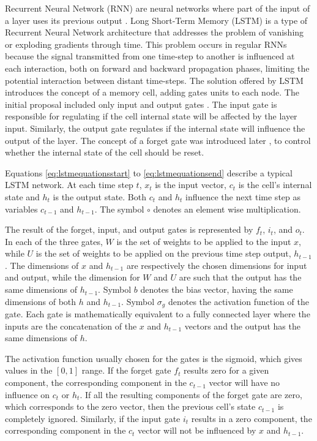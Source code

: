 
Recurrent Neural Network (RNN) are neural networks where part of the input of a layer uses its previous output \cite{hochreiter_long_1997}.
Long Short-Term Memory \cite{hochreiter_long_1997} (LSTM) is a type of Recurrent Neural Network architecture that addresses the problem of vanishing or exploding gradients through time. This problem occurs in regular RNNs because the signal transmitted from one time-step to another is influenced at each interaction, both on forward and backward propagation phases, limiting the potential interaction between distant time-steps. The solution offered by LSTM introduces the concept of a memory cell, adding gates units to each node. The initial proposal included only input and output gates \cite{hochreiter_long_1997}.
The input gate is responsible for regulating if the cell internal state will be affected by the layer input. Similarly, the output gate regulates if the internal state will influence the output of the layer. The concept of a forget gate was introduced later \cite{gers_learning_2000}, to control whether the internal state of the cell should be reset.

Equations \ref{eq:lstmequationsstart} to \ref{eq:lstmequationsend} describe a typical LSTM network. At each time step $t$, $x_t$ is the input vector, $c_t$ is the cell's internal state and $h_t$ is the output state. Both $c_t$ and $h_t$ influence the next time step as variables $c_{t-1}$ and $h_{t-1}$. The symbol $\circ$ denotes an element wise multiplication.

The result of the forget, input, and output gates is represented by $f_t$, $i_t$, and $o_t$.
In each of the three gates, $W$ is the set of weights to be applied to the input $x$, while $U$ is the set of weights to be applied on the previous time step output, $h_{t-1}$. 
The dimensions of $x$ and $h_{t-1}$ are respectively the chosen dimensions for input and output, while the dimension for $W$ and $U$ are such that the output has the same dimensions of $h_{t-1}$.  Symbol $b$ denotes the bias vector, having the same dimensions of both $h$ and $h_{t-1}$. Symbol $\sigma_g$ denotes the activation function of the gate. Each gate is mathematically equivalent to a fully connected layer where the inputs are the concatenation of the $x$ and $h_{t-1}$ vectors and the output has the same dimensions of $h$.

The activation function usually chosen for the gates is the sigmoid, which gives values in the $[0,1]$ range. If the forget gate $f_t$ results zero for a given component, the corresponding component in the $c_{t-1}$ vector will have no influence on $c_t$ or $h_t$. If all the resulting components of the forget gate are zero, which corresponds to the zero vector, then the previous cell's state $c_{t-1}$ is completely ignored.
Similarly, if the input gate $i_t$ results in a zero component, the corresponding component in the $c_t$ vector will not be influenced by $x$ and $h_{t-1}$.

